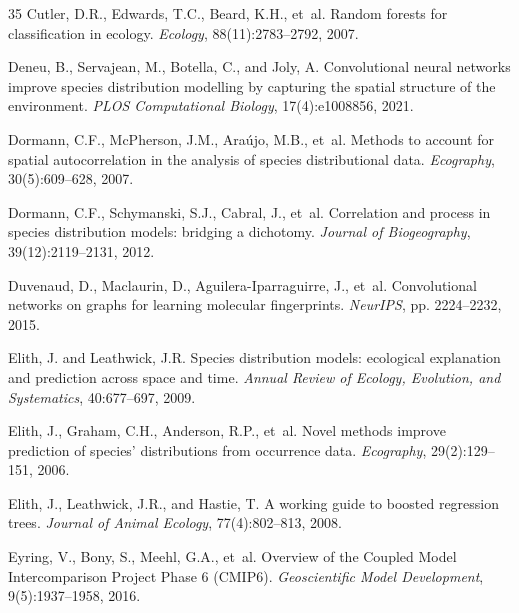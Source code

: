 \begin{thebibliography}{35}
Cutler, D.R., Edwards, T.C., Beard, K.H., et~al.
\newblock Random forests for classification in ecology.
\newblock \emph{Ecology}, 88(11):2783--2792, 2007.

Deneu, B., Servajean, M., Botella, C., and Joly, A.
\newblock Convolutional neural networks improve species distribution modelling
  by capturing the spatial structure of the environment.
\newblock \emph{PLOS Computational Biology}, 17(4):e1008856, 2021.

Dormann, C.F., McPherson, J.M., Ara{\'u}jo, M.B., et~al.
\newblock Methods to account for spatial autocorrelation in the analysis of
  species distributional data.
\newblock \emph{Ecography}, 30(5):609--628, 2007.

Dormann, C.F., Schymanski, S.J., Cabral, J., et~al.
\newblock Correlation and process in species distribution models: bridging a
  dichotomy.
\newblock \emph{Journal of Biogeography}, 39(12):2119--2131, 2012.

Duvenaud, D., Maclaurin, D., Aguilera-Iparraguirre, J., et~al.
\newblock Convolutional networks on graphs for learning molecular fingerprints.
\newblock \emph{NeurIPS}, pp. 2224--2232, 2015.

Elith, J. and Leathwick, J.R.
\newblock Species distribution models: ecological explanation and prediction
  across space and time.
\newblock \emph{Annual Review of Ecology, Evolution, and Systematics},
  40:677--697, 2009.

Elith, J., Graham, C.H., Anderson, R.P., et~al.
\newblock Novel methods improve prediction of species' distributions from
  occurrence data.
\newblock \emph{Ecography}, 29(2):129--151, 2006.

Elith, J., Leathwick, J.R., and Hastie, T.
\newblock A working guide to boosted regression trees.
\newblock \emph{Journal of Animal Ecology}, 77(4):802--813, 2008.

Eyring, V., Bony, S., Meehl, G.A., et~al.
\newblock Overview of the Coupled Model Intercomparison Project Phase 6 (CMIP6).
\newblock \emph{Geoscientific Model Development}, 9(5):1937--1958, 2016.


\end{thebibliography}
